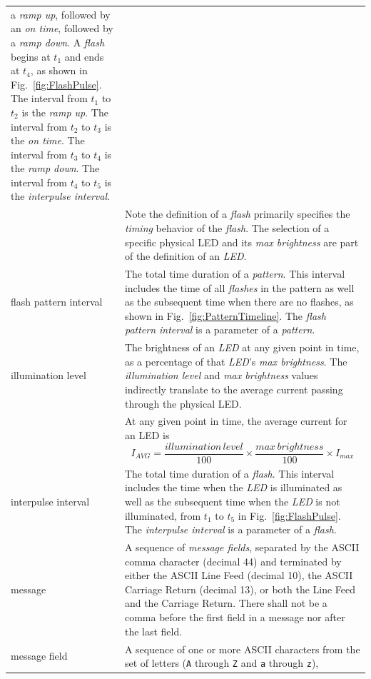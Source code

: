 \documentclass[letterpaper,11pt]{article}
\begin{document}
\begin{supertabular}{p{1.25in}p{5.25in}}
    a \textit{ramp up}, followed by an \textit{on time}, followed by a
    \textit{ramp down}. A \textit{flash} begins at $t_1$ and ends at $t_4$,
    as shown in Fig.\ \ref{fig:FlashPulse}. The interval from $t_1$ to $t_2$
    is the \textit{ramp up}. The interval from $t_2$ to $t_3$ is the \textit{on
    time}.  The interval from $t_3$ to $t_4$ is the \textit{ramp down}. The
    interval from $t_4$ to $t_5$ is the \textit{interpulse interval}.\\
    &
    Note the definition of a \textit{flash} primarily specifies the
    \textit{timing} behavior of the \textit{flash}. The selection of a specific
    physical LED and its \textit{max brightness} are part of the definition
    of an \textit{LED}.\\
flash pattern interval &
    The total time duration of a \textit{pattern}.
    This interval includes the time of all \textit{flashes} in the pattern
    as well as the subsequent time when there are no flashes, as shown in
    Fig.\ \ref{fig:PatternTimeline}. The
    \textit{flash pattern interval} is a parameter of a \textit{pattern}.\\
illumination level &
    The brightness of an \textit{LED} at any given point in time, as a
    percentage of that \textit{LED}'s \textit{max brightness}. The
    \textit{illumination level} and \textit{max brightness} values
    indirectly translate to the average current passing through the physical
    LED.\\
    &
    At any given point in time, the average current for an LED is
\[ I_{AVG} = \frac{illumination\,level}{100} \times \frac{max\,brightness}{100}
\times I_{max}\]\\
interpulse interval &
    The total time duration of a \textit{flash}. This interval includes the
    time when the \textit{LED} is illuminated as well as the subsequent time
    when the \textit{LED} is not illuminated, from $t_1$ to $t_5$ in
    Fig.\ \ref{fig:FlashPulse}. The \textit{interpulse interval} is a parameter
    of a \textit{flash}.\\
message &  A sequence of \textit{message fields}, separated by the
    ASCII comma character (decimal 44) and terminated by either the ASCII Line
    Feed (decimal 10), the ASCII Carriage Return (decimal 13), or both the Line
    Feed and the Carriage Return. There shall not be a comma before the first
    field in a message nor after the last field.\\
message field &  A sequence of one or more ASCII characters from the set of
    letters (\texttt{A} through \texttt{Z} and \texttt{a} through \texttt{z}),

\end{supertabular}
\end{document}
